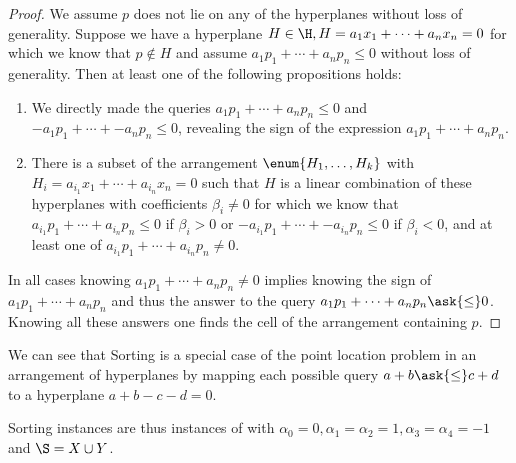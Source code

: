 \begin{proof}
We assume \(p\) does not lie on any of the hyperplanes without loss of generality.
Suppose we have a hyperplane \(H \in \H, H = a_1 x_1 + \cdots + a_n x_n = 0\) for which we
know that \(p \notin H\) and assume \(a_1 p_1 + \cdots + a_n p_n \le 0\)
without loss of generality.
Then at least one of the following propositions holds:
\begin{enumerate}
\item We directly made the queries \(a_1 p_1 + \cdots + a_n p_n \le 0\) and
\(-a_1 p_1 + \cdots + -a_n p_n \le 0\), revealing the sign of the expression
\(a_1 p_1 + \cdots + a_n p_n\).
\item There is a subset of the arrangement \(\enum{H_1,\ldots,H_k}\) with
\(H_i = a_{i_1} x_1 + \cdots + a_{i_n} x_n = 0\) such that \(H\) is a linear
combination of these hyperplanes with coefficients \(\beta_i \neq 0\) for which we
know that \(a_{i_1} p_1 + \cdots + a_{i_n} p_n \le 0\) if \(\beta_i > 0\) or
\(-a_{i_1} p_1 + \cdots + -a_{i_n} p_n \le 0\) if \(\beta_i < 0\), and at
least one of \(a_{i_1} p_1 + \cdots + a_{i_n} p_n \neq 0\).
\end{enumerate}
In all cases knowing \(a_1 p_1 + \cdots + a_n p_n \neq 0\) implies knowing the
sign of \(a_1 p_1 + \cdots + a_n p_n\) and thus the answer to the query \(a_1
p_1 + \cdots + a_n p_n \ask{\le} 0\). Knowing all these answers one finds the
cell of the arrangement containing \(p\).
\end{proof}

We can see that Sorting \XY is a special case of the point location problem in
an arrangement of hyperplanes by mapping each possible query $a + b \ask{\le} c
+ d$ to a hyperplane $a + b - c - d = 0$.

Sorting \XY instances are thus instances of \fourLDT
with $\alpha_0 = 0, \alpha_1 = \alpha_2 = 1, \alpha_3 = \alpha_4 = -1$ and
$\S = X \cup Y$.
